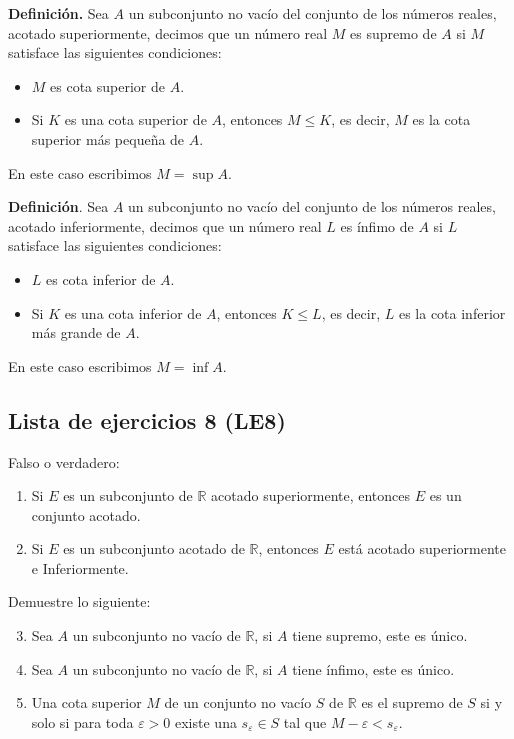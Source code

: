 \documentclass[11pt]{article}
\newcommand{\R}{\mathbb{R}}
\begin{document}
\textbf{Definición.} Sea $A$ un subconjunto no vacío del conjunto de los números reales, acotado superiormente, decimos que un número real $M$ es supremo de $A$ si $M$ satisface las siguientes condiciones: \begin{itemize}
    \item $M$ es cota superior de $A$.
    \item Si $K$ es una cota superior de $A$, entonces $M\leq K$, es decir, $M$ es la cota superior más pequeña de $A$.
\end{itemize}

En este caso escribimos $M=\sup{A}$.

\textbf{Definición}. Sea $A$ un subconjunto no vacío del conjunto de los números reales, acotado inferiormente, decimos que un número real $L$ es ínfimo de $A$ si $L$ satisface las siguientes condiciones: \begin{itemize}
    \item $L$ es cota inferior de $A$.
    \item Si $K$ es una cota inferior de $A$, entonces $K\leq L$, es decir, $L$ es la cota inferior más grande de $A$.
\end{itemize}

En este caso escribimos $M=\inf{A}$.

\pagebreak

\subsection*{Lista de ejercicios 8 (LE8)}

Falso o verdadero: \begin{enumerate}[label=\arabic*.]
    \item Si $E$ es un subconjunto de $\R$ acotado superiormente, entonces $E$ es un conjunto acotado.
    \item Si $E$ es un subconjunto acotado de $\R$, entonces $E$ está acotado superiormente e Inferiormente.
\end{enumerate}

Demuestre lo siguiente:

\begin{enumerate}[label=\arabic*.]\setcounter{enumi}{2}
    \item Sea $A$ un subconjunto no vacío de $\R$, si $A$ tiene supremo, este es único.
    \item Sea $A$ un subconjunto no vacío de $\R$, si $A$ tiene ínfimo, este es único.
    \item Una cota superior $M$ de un conjunto no vacío $S$ de $\R$ es el supremo de $S$ si y solo si para toda $\varepsilon>0$ existe una $s_\varepsilon \in S$ tal que $M-\varepsilon<s_\varepsilon$.
\end{enumerate}
\end{document}
